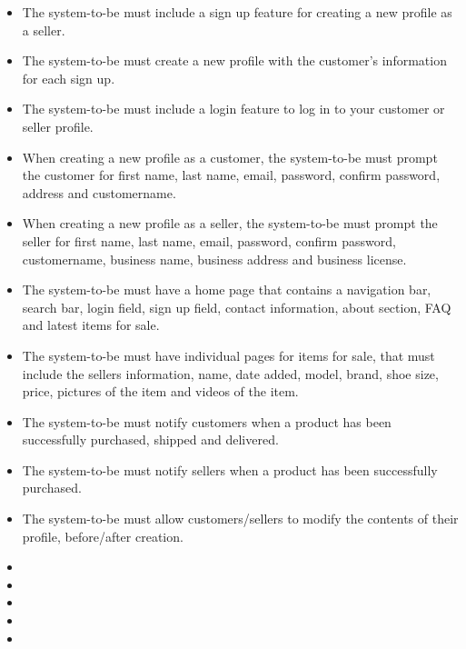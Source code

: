 \begin{itemize}
  \item The system-to-be must include a sign up feature for creating a new profile as a seller.
  \item The system-to-be must create a new profile with the customer's information for each sign up.
  \item The system-to-be must include a login feature to log in to your customer or seller profile.
  \item When creating a new profile as a customer, the system-to-be must prompt the customer for first name, last name, email, password, confirm password, address and customername.
  \item When creating a new profile as a seller, the system-to-be must prompt the seller for first name, last name, email, password, confirm password, customername, business name, business address and business license.
  \item The system-to-be must have a home page that contains a navigation bar, search bar, login field, sign up field, contact information, about section, FAQ and latest items for sale.
  \item The system-to-be must have individual pages for items for sale, that must include the sellers information, name, date added, model, brand, shoe size, price, pictures of the item and videos of the item.
  \item The system-to-be must notify customers when a product has been successfully purchased, shipped and delivered.
  \item The system-to-be must notify sellers when a product has been successfully purchased.
  \item The system-to-be must allow customers/sellers to modify the contents of their profile, before/after creation.
  \item {}
  \item {}
  \item {}
  \item {}
  \item {}
\end{itemize}
